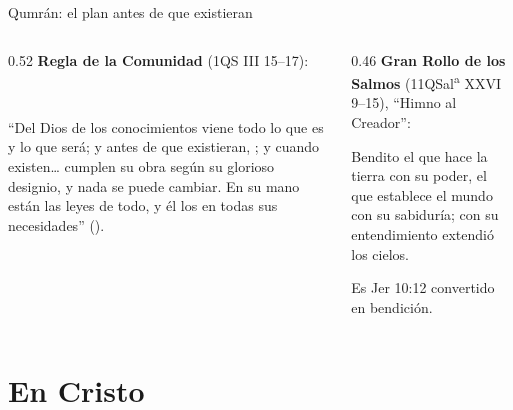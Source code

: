 \begin{frame}{Qumrán: el plan antes de que existieran}
\begin{columns}[t,onlytextwidth]
\begin{column}{0.52\textwidth}\small
\textbf{Regla de la Comunidad} (1QS III 15--17):
\begin{center}\\ \end{center}
``Del Dios de los conocimientos viene todo lo que es y lo que será; y antes de que existieran, ; y cuando existen\ldots{} cumplen su obra según su glorioso designio, y nada se puede cambiar. En su mano están las leyes de todo, y él los  en todas sus necesidades'' ().
\end{column}
\begin{column}{0.46\textwidth}\small
\textbf{Gran Rollo de los Salmos} (11QSal\textsuperscript{a} XXVI 9--15), ``Himno al Creador'':\par\smallskip
\begin{cita}Bendito el que hace la tierra con su poder, el que establece el mundo con su sabiduría; con su entendimiento extendió los cielos.\end{cita}
\scriptsize Es Jer 10:12 convertido en bendición.\par\smallskip
{}
\end{column}
\end{columns}
\end{frame}

\section{En Cristo}

